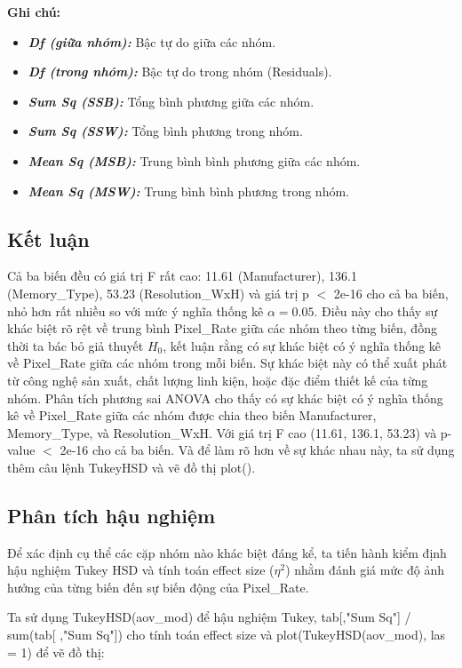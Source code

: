\newpage
\textbf{Ghi chú:}
\begin{itemize}
  \item \textbf{\textit{Df (giữa nhóm):}} Bậc tự do giữa các nhóm.
  \item \textbf{\textit{Df (trong nhóm):}} Bậc tự do trong nhóm (Residuals).
  \item \textbf{\textit{Sum Sq (SSB):}} Tổng bình phương giữa các nhóm.
  \item \textbf{\textit{Sum Sq (SSW):}} Tổng bình phương trong nhóm.
  \item \textbf{\textit{Mean Sq (MSB):}} Trung bình bình phương giữa các nhóm.
  \item \textbf{\textit{Mean Sq (MSW):}} Trung bình bình phương trong nhóm.
\end{itemize}

\subsection{Kết luận}

Cả ba biến đều có giá trị F rất cao: 11.61 (Manufacturer), 136.1 (Memory\_Type), 53.23 (Resolution\_WxH) và giá trị p $<$ 2e-16 cho cả ba biến, nhỏ hơn rất nhiều so với mức ý nghĩa thống kê $\alpha = 0.05$. Điều này cho thấy sự khác biệt rõ rệt về trung bình Pixel\_Rate giữa các nhóm theo từng biến, đồng thời ta bác bỏ giả thuyết $H_0$, kết luận rằng có sự khác biệt có ý nghĩa thống kê về Pixel\_Rate giữa các nhóm trong mỗi biến. Sự khác biệt này có thể xuất phát từ công nghệ sản xuất, chất lượng linh kiện, hoặc đặc điểm thiết kế của từng nhóm. Phân tích phương sai ANOVA cho thấy có sự khác biệt có ý nghĩa thống kê về Pixel\_Rate giữa các nhóm được chia theo biến Manufacturer, Memory\_Type, và Resolution\_WxH. Với giá trị F cao (11.61, 136.1, 53.23) và p-value $<$ 2e-16 cho cả ba biến. Và để làm rõ hơn về sự khác nhau này, ta sử dụng thêm câu lệnh TukeyHSD và vẽ đồ thị plot().

\subsection{Phân tích hậu nghiệm}

Để xác định cụ thể các cặp nhóm nào khác biệt đáng kể, ta tiến hành kiểm định hậu nghiệm Tukey HSD và tính toán effect size ($\eta^2$) nhằm đánh giá mức độ ảnh hưởng của từng biến đến sự biến động của Pixel\_Rate.

Ta sử dụng TukeyHSD(aov\_mod) để hậu nghiệm Tukey, tab[,"Sum Sq"] / sum(tab[ ,"Sum Sq"]) cho tính toán effect size và plot(TukeyHSD(aov\_mod), las = 1) để vẽ đồ thị:

